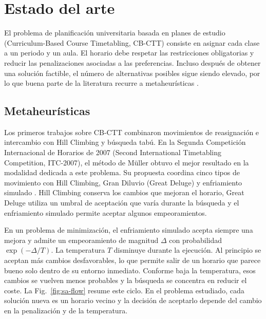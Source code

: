
\section{Estado del arte}
\label{sec:estado-arte-p2}

El problema de planificación universitaria basada en planes de estudio (Curriculum-Based Course Timetabling, CB-CTT) consiste en asignar cada clase a un periodo y un aula. El horario debe respetar las restricciones obligatorias y reducir las penalizaciones asociadas a las preferencias. Incluso después de obtener una solución factible, el número de alternativas posibles sigue siendo elevado, por lo que buena parte de la literatura recurre a metaheurísticas \cite{ceschia2023educational}.

\subsection{Metaheurísticas}

Los primeros trabajos sobre CB-CTT combinaron movimientos de reasignación e intercambio con Hill Climbing y búsqueda tabú. En la Segunda Competición Internacional de Horarios de 2007 (Second International Timetabling Competition, ITC-2007), el método de Müller obtuvo el mejor resultado en la modalidad dedicada a este problema. Su propuesta coordina cinco tipos de movimiento con Hill Climbing, Gran Diluvio (Great Deluge) y enfriamiento simulado \cite{muller2009itc}. Hill Climbing conserva los cambios que mejoran el horario, Great Deluge utiliza un umbral de aceptación que varía durante la búsqueda y el enfriamiento simulado permite aceptar algunos empeoramientos.

En un problema de minimización, el enfriamiento simulado acepta siempre una mejora y admite un empeoramiento de magnitud $\Delta$ con probabilidad $\exp(-\Delta/T)$. La temperatura $T$ disminuye durante la ejecución. Al principio se aceptan más cambios desfavorables, lo que permite salir de un horario que parece bueno solo dentro de su entorno inmediato. Conforme baja la temperatura, esos cambios se vuelven menos probables y la búsqueda se concentra en reducir el coste. La Fig.~\ref{fig:sa-flow} resume este ciclo. En el problema estudiado, cada solución nueva es un horario vecino y la decisión de aceptarlo depende del cambio en la penalización y de la temperatura.

